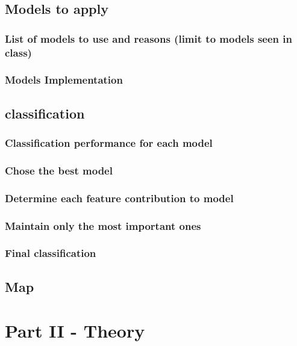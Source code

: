 \documentclass[]{article}
\begin{document}
\subsection{Models to apply}\label{models-to-apply}

\subsubsection{List of models to use and reasons (limit to models seen
in
class)}\label{list-of-models-to-use-and-reasons-limit-to-models-seen-in-class}

\subsubsection{Models Implementation}\label{models-implementation}

\subsection{classification}\label{classification}

\subsubsection{Classification performance for each
model}\label{classification-performance-for-each-model}

\subsubsection{Chose the best model}\label{chose-the-best-model}

\subsubsection{Determine each feature contribution to
model}\label{determine-each-feature-contribution-to-model}

\subsubsection{Maintain only the most important
ones}\label{maintain-only-the-most-important-ones}

\subsubsection{Final classification}\label{final-classification}

\subsection{Map}\label{map}

\section{Part II - Theory}\label{part-ii---theory}
\end{document}
